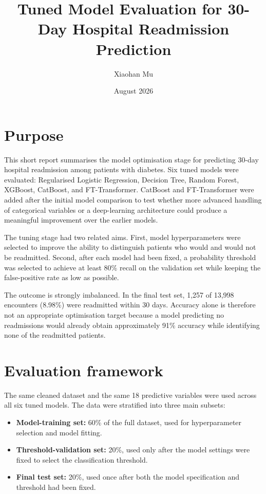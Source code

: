 \documentclass[11pt,a4paper]{article}
\title{Tuned Model Evaluation for 30-Day Hospital Readmission Prediction}
\author{Xiaohan Mu}
\date{August 2026}
\begin{document}
\maketitle

\section{Purpose}

This short report summarises the model optimisation stage for predicting 30-day hospital readmission among patients with diabetes. Six tuned models were evaluated: Regularised Logistic Regression, Decision Tree, Random Forest, XGBoost, CatBoost, and FT-Transformer. CatBoost and FT-Transformer were added after the initial model comparison to test whether more advanced handling of categorical variables or a deep-learning architecture could produce a meaningful improvement over the earlier models.

The tuning stage had two related aims. First, model hyperparameters were selected to improve the ability to distinguish patients who would and would not be readmitted. Second, after each model had been fixed, a probability threshold was selected to achieve at least 80\% recall on the validation set while keeping the false-positive rate as low as possible.

The outcome is strongly imbalanced. In the final test set, 1,257 of 13,998 encounters (8.98\%) were readmitted within 30 days. Accuracy alone is therefore not an appropriate optimisation target because a model predicting no readmissions would already obtain approximately 91\% accuracy while identifying none of the readmitted patients.

\section{Evaluation framework}

The same cleaned dataset and the same 18 predictive variables were used across all six tuned models. The data were stratified into three main subsets:

\begin{itemize}
    \item \textbf{Model-training set:} 60\% of the full dataset, used for hyperparameter selection and model fitting.
    \item \textbf{Threshold-validation set:} 20\%, used only after the model settings were fixed to select the classification threshold.
    \item \textbf{Final test set:} 20\%, used once after both the model specification and threshold had been fixed.
\end{itemize}
\end{document}
